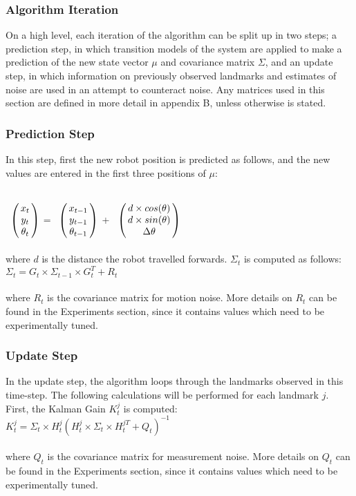 \documentclass{ba-kecs}
\numberwithin{figure}{section}
\numberwithin{equation}{section}
\begin{document}
\subsubsection{Algorithm Iteration}
On a high level, each iteration of the algorithm can be split up in two steps; a prediction step, in which transition models of the system are applied to make a prediction of the new state vector $\mu$ and covariance matrix $\Sigma$, and an update step, in which information on previously observed landmarks and estimates of noise are used in an attempt to counteract noise. Any matrices used in this section are defined in more detail in appendix B, unless otherwise is stated.

\subsubsection{Prediction Step}
In this step, first the new robot position is predicted as follows, and the new values are entered in the first three positions of $\mu$:

$\bordermatrix{ 	& \cr
                 &x_{t} \cr
                 &y_{t} \cr
                 &\theta_{t} \cr}$
=
$\bordermatrix{ 	& \cr
                 &x_{t-1} \cr
                 &y_{t-1} \cr
                 &\theta_{t-1} \cr}$
+
$\bordermatrix{ 	& \cr
                 &d \times cos(\theta) \cr
                 &d \times sin(\theta) \cr
                 &\Delta\theta \cr}$ \\ \\
where $d$ is the distance the robot travelled forwards. $\Sigma_t$ is computed as follows: \\

$\Sigma_t = G_t \times \Sigma_{t-1} \times G_t^T + R_t$ \\ \\
where $R_t$ is the covariance matrix for motion noise. More details on $R_t$ can be found in the Experiments section, since it contains values which need to be experimentally tuned.

\subsubsection{Update Step}
In the update step, the algorithm loops through the landmarks observed in this time-step. The following calculations will be performed for each landmark $j$. First, the Kalman Gain $K_t^j$ is computed: \\

$K_t^j = \Sigma_t \times H_t^j (H_t^j \times \Sigma_t \times H_t^{jT} + Q_t)^{-1}$ \\ \\
where $Q_t$ is the covariance matrix for measurement noise. More details on $Q_t$ can be found in the Experiments section, since it contains values which need to be experimentally tuned. 
\end{document}
